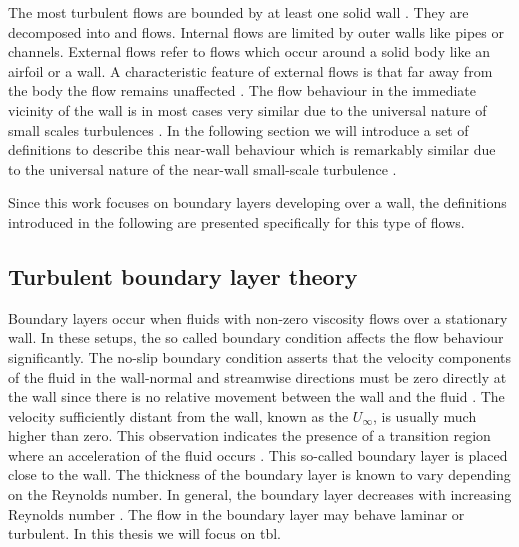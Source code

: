 The most turbulent flows are bounded by at least one solid wall \citep{moin_fundamentals_2024}.
They are decomposed into  and  flows. 
Internal flows are limited by outer walls like pipes or channels.
External flows refer to flows which occur around a solid body like an airfoil or a wall.
A characteristic feature of external flows is that far away from the body the flow remains unaffected \citep{moin_fundamentals_2024}.
The flow behaviour in the immediate vicinity of the wall is in most cases very similar due to the universal nature of small scales turbulences \citep{pope_turbulent_2015}.
In the following section we will introduce a set of definitions to describe this near-wall behaviour which is remarkably similar due to the universal nature of the near-wall small-scale turbulence \citep{pope_turbulent_2015}. 

Since this work focuses on boundary layers developing over a wall, the definitions introduced in the following are presented specifically for this type of flows.

\subsection{Turbulent boundary layer theory} \label{subsec:TBLTheory}

Boundary layers occur when fluids with non-zero viscosity flows over a stationary wall. 
In these setups, the so called  boundary condition affects the flow behaviour significantly.
The no-slip boundary condition asserts that the velocity components of the fluid in the wall-normal and streamwise directions must be zero directly at the wall since there is no relative movement between the wall and the fluid \citep{schlichting_boundary-layer_2017}. 
The velocity sufficiently distant from the wall, known as the  $U_{\infty}$, is usually much higher than zero. This observation indicates the presence of a transition region where an acceleration of the fluid occurs \citep{prandtl_uber_1904}.
This so-called boundary layer is placed close to the wall. 
The thickness of the boundary layer is known to vary depending on the Reynolds number. In general, the boundary layer decreases with increasing Reynolds number \cite{schlichting_boundary-layer_2017}. 
The flow in the boundary layer may behave laminar or turbulent. In this thesis we will focus on \acrfull{tbl}.

